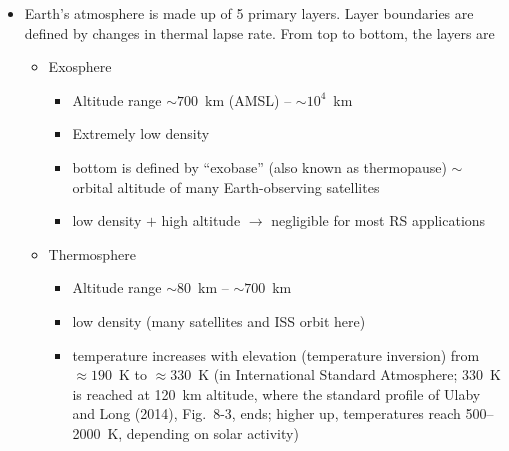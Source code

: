 \documentclass[11pt, oneside]{article}
\begin{document}
\begin{itemize}
	\item Earth's atmosphere is made up of 5 primary layers. Layer boundaries are defined by changes in thermal lapse rate. From top to bottom, the layers are
	\begin{itemize}
		\item Exosphere
		\begin{itemize}
			\item[--] Altitude range ${\sim}700$~km (AMSL) -- ${\sim}10^4$~km
			\item[--] Extremely low density
			\item[--] bottom is defined by ``exobase'' (also known as thermopause) ${\sim}$ orbital altitude of many Earth-observing satellites
			\item[--] low density $+$ high altitude $\rightarrow$ negligible for most RS applications
		\end{itemize}
		\item Thermosphere
		\begin{itemize}
			\item[--] Altitude range ${\sim}80$~km -- ${\sim}700$~km
			\item[--] low density (many satellites and ISS orbit here)
			\item[--] temperature increases with elevation (temperature inversion) from ${\approx}190$~K to ${\approx}330$~K (in International Standard Atmosphere; 330~K is reached at 120~km altitude, where the standard profile of Ulaby and Long (2014), Fig.~8-3, ends; higher up, temperatures reach 500--2000~K, depending on solar activity)

\end{itemize}
\end{itemize}
\end{itemize}
\end{document}
